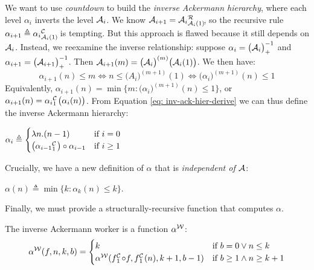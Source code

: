 We want to use \emph{countdown} to build the \emph{inverse Ackermann hierarchy}, where each
level $\alpha_i$ inverts the level $\mathcal{A}_i$.
We know $\Ack_{i+1} = \rf{\Ack_i}{\Ack_i(1)}$, so the recursive
rule $\alpha_{i+1} \triangleq \cdt{\alpha_i}{\Ack_i(1)}$ is tempting.
But this approach is flawed because it still depends on $\mathcal{A}_i$.
Instead, we reexamine the inverse relationship: suppose $\alpha_i = \big(\mathcal{A}_i\big)^{-1}_+$ and $\alpha_{i+1} = \big(\mathcal{A}_{i+1}\big)^{-1}_+$. Then $\mathcal{A}_{i+1}(m) = \big(\mathcal{A}_{i}\big)^{(m)} \big(\mathcal{A}_{i}(1)\big)$. We then have:
\begin{equation} \label{eq: inv-ack-hier-derive}
\alpha_{i+1}(n)\le m \iff n\le \big(A_i\big)^{(m+1)}(1) \iff \big(\alpha_i\big)^{(m+1)}(n) \le 1
\end{equation}
Equivalently, $\alpha_{i+1}(n) = \min\big\{m : \big( \alpha_i \big)^{(m+1)}(n)\le 1\big\}$, or $\alpha_{i+1}(n) = \cdt{\alpha_i}{1}\big(\alpha_i(n)\big)$. From Equation \ref{eq: inv-ack-hier-derive} we can thus define the inverse Ackermann hierarchy:
\begin{defn} \label{defn: inv-ack-hier}
	$ \alpha_i \triangleq \begin{cases}
	\lambda n.(n - 1) & \text{if } i = 0
	\\ \big(\cdt{\alpha_{i-1}}{1}\big)\circ \alpha_{i-1} & \text{if } i\ge 1 \end{cases}
$
\end{defn}
Crucially, we have a new definition of $\alpha$ 
that is \emph{independent of $\mathcal{A}$}:
\begin{defn} \label{thm: inv-ack-hier-correct}
	$\alpha(n) \triangleq \min\big\{k : \alpha_k(n)\le k \big\}$.
\end{defn}
Finally, we must provide a structurally-recursive function that computes $\alpha$.
\begin{defn} \label{defn: inv-ack-worker}
	The inverse Ackermann worker is a function $\alpha^{\mathcal{W}}$: %
	\begin{equation} \label{eq: inv-ack-worker-recursion}
	\alpha^{\W}(f, n, k, b) = \begin{cases}
	k & \text{if } b = 0 \vee n\le k \\ \alpha^{\W}(\cdt{f}{1}\circ f , \cdt{f}{1}(n), k+1, b-1) & \text{if } b \ge 1 \wedge n \ge k+1
	\end{cases}
	\end{equation}
\end{defn}
